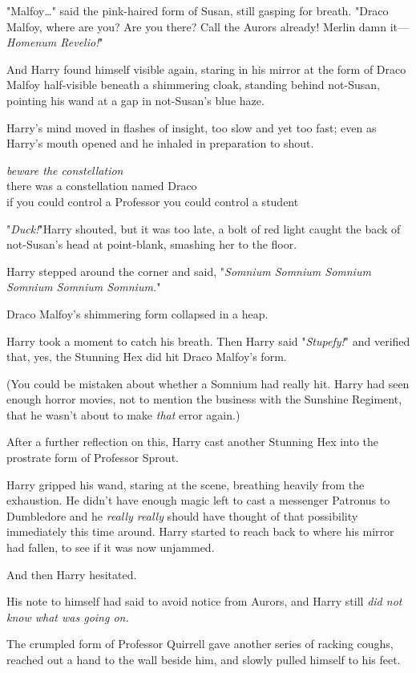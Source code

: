 "Malfoy{\ldots}" said the pink-haired form of Susan, still gasping for breath. 
"Draco Malfoy, where are you? Are you there? Call the Aurors already! Merlin 
damn it---\emph{Homenum Revelio!}"

And Harry found himself visible again, staring in his mirror at the form of 
Draco Malfoy half-visible beneath a shimmering cloak, standing behind 
not-Susan, pointing his wand at a gap in not-Susan's blue haze.

Harry's mind moved in flashes of insight, too slow and yet too fast; even as 
Harry's mouth opened and he inhaled in preparation to shout.

\noindent{}\emph{beware the constellation}\\
there was a constellation named Draco\\
if you could control a Professor you could control a student

"\emph{Duck!}"Harry shouted, but it was too late, a bolt of red light caught 
the back of not-Susan's head at point-blank, smashing her to the floor.

Harry stepped around the corner and said, "\emph{Somnium Somnium Somnium 
Somnium Somnium Somnium.}"

Draco Malfoy's shimmering form collapsed in a heap.

Harry took a moment to catch his breath. Then Harry said "\emph{Stupefy!}" and 
verified that, yes, the Stunning Hex did hit Draco Malfoy's form.

(You could be mistaken about whether a Somnium had really hit. Harry had seen 
enough horror movies, not to mention the business with the Sunshine Regiment, 
that he wasn't about to make \emph{that} error again.)

After a further reflection on this, Harry cast another Stunning Hex into the 
prostrate form of Professor Sprout.

Harry gripped his wand, staring at the scene, breathing heavily from the 
exhaustion. He didn't have enough magic left to cast a messenger Patronus to 
Dumbledore and he \emph{really really} should have thought of that possibility 
immediately this time around. Harry started to reach back to where his mirror 
had fallen, to see if it was now unjammed.

And then Harry hesitated.

His note to himself had said to avoid notice from Aurors, and Harry still 
\emph{did not know what was going on.}

The crumpled form of Professor Quirrell gave another series of racking coughs, 
reached out a hand to the wall beside him, and slowly pulled himself to his 
feet.

